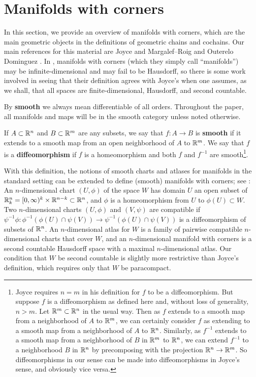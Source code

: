 
\section{Manifolds with corners}\label{S: manifolds with corners}

In this section, we provide an overview of manifolds with corners, which are the main geometric objects in the definitions of geometric chains and cochains.
Our main references for this material are Joyce \cite{Joy12} and Margalef--Roig and Outerelo Dominguez \cite{MaDo92}. In \cite{MaDo92}, manifolds with corners (which they simply call ``manifolds'') may be infinite-dimensional and may fail to be Hausdorff, so there is some work involved in seeing that their definition agrees with Joyce's when one assumes, as we shall, that all spaces are finite-dimensional, Hausdorff, and second countable.

By \textbf{smooth} we always mean differentiable of all orders.
Throughout the paper, all manifolds and maps will be in the smooth category unless noted otherwise.

\begin{definition}\label{D: smooth}
	If $A \subset \mathbb{R}^n$ and $B \subset \mathbb{R}^m$ are any subsets, we say that $f \colon A \to B$ is \textbf{smooth} if it extends to a smooth map from an open neighborhood of $A$ to $\mathbb{R}^m$.
	We say that $f$ is a \textbf{diffeomorphism} if $f$ is a homeomorphism and both $f$ and $f^{-1}$ are smooth\footnote{Joyce requires $n = m$ in his definition for $f$ to be a diffeomorphism.
	But suppose $f$ is a diffeomorphism as defined here and, without loss of generality, $n>m$.
	Let $\mathbb{R}^m \subset \mathbb{R}^n$ in the usual way.
	Then as $f$ extends to a smooth map from a neighborhood of $A$ to $\mathbb{R}^m$, we can certainly consider $f$ as extending to a smooth map from a neighborhood of $A$ to $\mathbb{R}^n$.
	Similarly, as $f^{-1}$ extends to a smooth map from a neighborhood of $B$ in $\mathbb{R}^m$ to $\mathbb{R}^n$, we can extend $f^{-1}$ to a neighborhood $B$ in $\mathbb{R}^n$ by precomposing with the projection $\mathbb{R}^n \to \mathbb{R}^m$.
	So diffeomorphisms in our sense can be made into diffeomorphisms in Joyce's sense, and obviously vice versa.}.
\end{definition}

With this definition, the notions of smooth charts and atlases for manifolds in the standard setting can be extended to define (smooth) manifolds with corners; see \cite[Section 2]{Joy12}: An $n$-dimensional chart $(U,\phi)$ of the space $W$ has domain $U$ an open subset of $\mathbb{R}^n_k = [0,\infty)^k \times \mathbb{R}^{n-k} \subset \mathbb{R}^n$, and $\phi$ is a homeomorphism from $U$ to $\phi(U) \subset W$.
Two $n$-dimensional charts $(U,\phi)$ and $(V,\psi)$ are compatible if $\psi^{-1}\phi \colon \phi^{-1}(\phi(U) \cap \psi(V)) \to \psi^{-1}(\phi(U) \cap \psi(V))$ is a diffeomorphism of subsets of $\mathbb{R}^n$.
An $n$-dimensional atlas for $W$ is a family of pairwise compatible $n$-dimensional charts that cover $W$, and an $n$-dimensional manifold with corners is a second countable Hausdorff space with a maximal $n$-dimensional atlas.
Our condition that $W$ be second countable is slightly more restrictive than Joyce's definition, which requires only that $W$ be paracompact.

